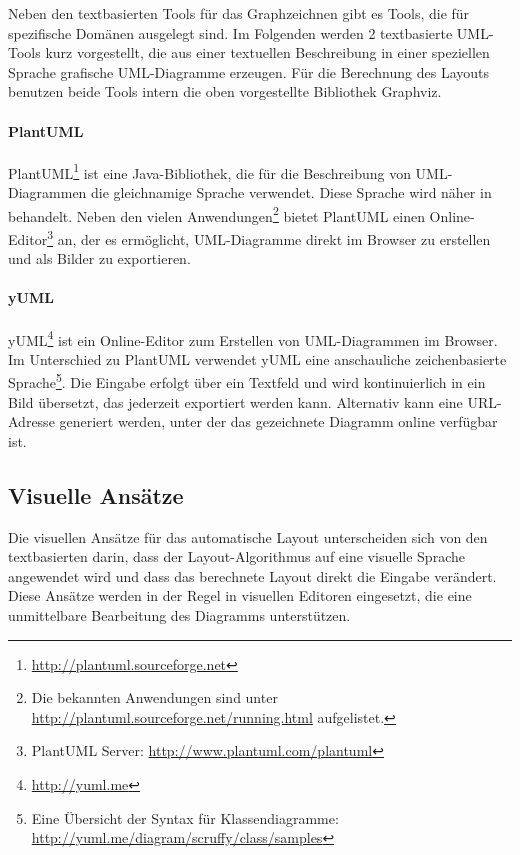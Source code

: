 Neben den textbasierten Tools für das Graphzeichnen gibt es Tools, die für spezifische Domänen ausgelegt sind. Im Folgenden werden 2 textbasierte UML-Tools kurz vorgestellt, die aus einer textuellen Beschreibung in einer speziellen Sprache grafische UML-Diagramme erzeugen. Für die Berechnung des Layouts benutzen beide Tools intern die oben vorgestellte Bibliothek Graphviz.

\paragraph{PlantUML}


PlantUML\footnote{\url{http://plantuml.sourceforge.net}} ist eine Java-Bibliothek, die für die Beschreibung von UML-Diagrammen die gleichnamige Sprache verwendet. Diese Sprache wird näher in \cite{Roques10Drawing} behandelt. Neben den vielen Anwendungen\footnote{Die bekannten Anwendungen sind unter \url{http://plantuml.sourceforge.net/running.html} aufgelistet.} bietet PlantUML einen Online-Editor\footnote{PlantUML Server: \url{http://www.plantuml.com/plantuml}} an, der es ermöglicht, UML-Diagramme direkt im Browser zu erstellen und als Bilder zu exportieren.

\paragraph{yUML}

yUML\footnote{\url{http://yuml.me}} ist ein Online-Editor zum Erstellen von UML-Diagrammen im Browser. Im Unterschied zu PlantUML verwendet yUML eine anschauliche zeichenbasierte Sprache\footnote{Eine Übersicht der Syntax für Klassendiagramme: \url{http://yuml.me/diagram/scruffy/class/samples}}. Die Eingabe erfolgt über ein Textfeld und wird kontinuierlich in ein Bild übersetzt, das jederzeit exportiert werden kann. Alternativ kann eine URL-Adresse generiert \cite{Fuhrmann11On-the-Pragmatics} werden, unter der das gezeichnete Diagramm online verfügbar ist.

\subsection{Visuelle Ansätze}
\label{subsec:visual-approaches}

Die visuellen Ansätze für das automatische Layout unterscheiden sich von den textbasierten darin, dass der Layout-Algorithmus auf eine visuelle Sprache angewendet wird und dass das berechnete Layout direkt die Eingabe verändert. Diese Ansätze werden in der Regel in visuellen Editoren eingesetzt, die eine unmittelbare Bearbeitung des Diagramms unterstützen.

